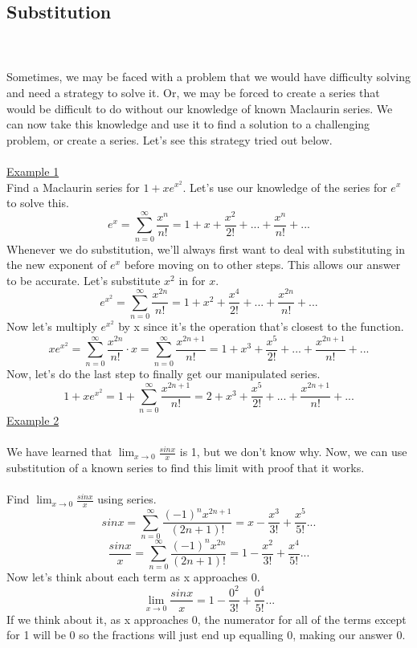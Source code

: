 \documentclass[a4paper,openright, 14pt]{article}
\begin{document}
\subsection{Substitution}\\\\
Sometimes, we may be faced with a problem that we would have difficulty solving and need a strategy to solve it. Or, we may be forced to create a series that would be difficult to do without our knowledge of known Maclaurin series. We can now take this knowledge and use it to find a solution to a challenging problem, or create a series. Let's see this strategy tried out below.\\\\
\underline{Example 1}\\
Find a Maclaurin series for $1+xe^{x^2}$. Let's use our knowledge of the series for $e^x$ to solve this.
$$e^x=\sum _{n=0}^\infty \frac{x^n}{n!}=1+x+\frac{x^2}{2!} +...+\frac{x^n}{n!}+...$$
Whenever we do substitution, we'll always first want to deal with substituting in the new exponent of $e^x$ before moving on to other steps. This allows our answer to be accurate. Let's substitute $x^2$ in for $x$.
$$e^{x^2}=\sum _{n=0}^\infty \frac{x^{2n}}{n!}=1+x^2+\frac{x^4}{2!} +...+\frac{x^{2n}}{n!}+...$$
Now let's multiply $e^{x^2}$ by x since it's the operation that's closest to the function.
$$xe^{x^2}=\sum _{n=0}^\infty \frac{x^{2n}}{n!}\cdot x=\sum _{n=0}^\infty \frac{x^{2n+1}}{n!}=1+x^3+\frac{x^5}{2!} +...+\frac{x^{2n+1}}{n!}+...$$
Now, let's do the last step to finally get our manipulated series.
$$1+xe^{x^2}=1+ \sum _{n=0}^\infty \frac{x^{2n+1}}{n!}=2+x^3+\frac{x^5}{2!} +...+\frac{x^{2n+1}}{n!}+...$$
\underline{Example 2}\\\\
We have learned that $\lim_{x\to0} \frac{sinx}{x}$ is 1, but we don't know why. Now, we can use substitution of a known series to find this limit with proof that it works.\\\\
Find $\lim_{x\to0} \frac{sinx}{x}$ using series.
$$sinx=\sum _{n=0}^\infty \frac{(-1)^nx^{2n+1}}{(2n+1)!}=x-\frac{x^3}{3!}+\frac{x^5}{5!}...$$
$$\frac{sinx}{x}=\sum _{n=0}^\infty \frac{(-1)^nx^{2n}}{(2n+1)!}=1-\frac{x^2}{3!}+\frac{x^4}{5!}...$$
Now let's think about each term as x approaches 0.
$$\lim_{x\to0} \frac{sinx}{x}=1-\frac{0^2}{3!}+\frac{0^4}{5!}...$$
If we think about it, as x approaches 0, the numerator for all of the terms except for 1 will be 0 so the fractions will just end up equalling 0, making our answer 0.\\\\
\end{document}
